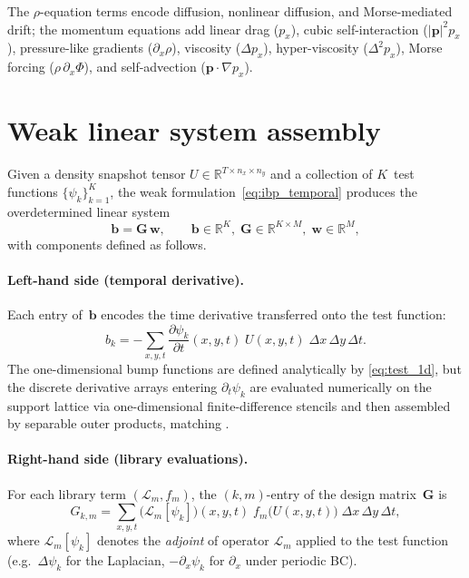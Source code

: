 \documentclass{report}
\theoremstyle{plain}
\theoremstyle{remark}
\numberwithin{equation}{section}              %
\begin{document}
The $\rho$-equation terms encode diffusion, nonlinear diffusion, and
Morse-mediated drift; the momentum equations add linear drag ($p_x$),
cubic self-interaction ($|\mathbf{p}|^2 p_x$), pressure-like gradients
($\partial_x\rho$), viscosity ($\Delta p_x$), hyper-viscosity
($\Delta^2 p_x$), Morse forcing ($\rho\,\partial_x\Phi$), and
self-advection ($\mathbf{p}\!\cdot\!\nabla p_x$).

%
\section{Weak linear system assembly}
\label{sec:weak_system}

Given a density snapshot tensor $U\in\mathbb{R}^{T\times n_x\times n_y}$
and a collection of $K$~test functions $\{\psi_k\}_{k=1}^K$, the weak
formulation~\eqref{eq:ibp_temporal} produces the overdetermined linear
system
\begin{equation}
  \mathbf{b} = \mathbf{G}\,\mathbf{w},
  \qquad
  \mathbf{b}\in\mathbb{R}^K,\;
  \mathbf{G}\in\mathbb{R}^{K\times M},\;
  \mathbf{w}\in\mathbb{R}^M,
  \label{eq:weak_system}
\end{equation}
with components defined as follows.

\paragraph{Left-hand side (temporal derivative).}
Each entry of~$\mathbf{b}$ encodes the time derivative transferred
onto the test function:
\begin{equation}
  b_k = -\sum_{x,y,t}
    \frac{\partial\psi_k}{\partial t}(x,y,t)\;
    U(x,y,t)\;
    \Delta x\,\Delta y\,\Delta t.
  \label{eq:b_vector}
\end{equation}
The one-dimensional bump functions are defined analytically by
\eqref{eq:test_1d}, but the discrete derivative arrays entering
$\partial_t\psi_k$ are evaluated numerically on the support lattice via
one-dimensional finite-difference stencils and then assembled by
separable outer products, matching .

\paragraph{Right-hand side (library evaluations).}
For each library term $(\mathcal{L}_m,f_m)$, the $(k,m)$-entry of the
design matrix~$\mathbf{G}$ is
\begin{equation}
  G_{k,m}
  = \sum_{x,y,t}
    \bigl(\mathcal{L}_m[\psi_k]\bigr)(x,y,t)\;
    f_m\!\bigl(U(x,y,t)\bigr)\;
    \Delta x\,\Delta y\,\Delta t,
  \label{eq:G_matrix}
\end{equation}
where $\mathcal{L}_m[\psi_k]$ denotes the \emph{adjoint} of operator
$\mathcal{L}_m$ applied to the test function (e.g.\ $\Delta\psi_k$ for
the Laplacian, $-\partial_x\psi_k$ for $\partial_x$ under periodic BC).
\end{document}
